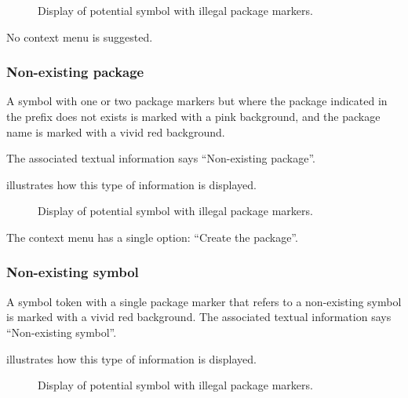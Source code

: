 \begin{figure}
\begin{center}
\end{center}
\caption{\label{fig-invalid-package-markers}
Display of potential symbol with illegal package markers.}
\end{figure}

No context menu is suggested. 

\subsubsection{Non-existing package}

A symbol with one or two package markers but where the package
indicated in the prefix does not exists is marked with a pink
background, and the package name is marked with a vivid red
background. 

The associated textual information says ``Non-existing package''.

 illustrates how this type of
information is displayed.

\begin{figure}
\begin{center}
\end{center}
\caption{\label{fig-non-existing-package}
Display of potential symbol with illegal package markers.}
\end{figure}

The context menu has a single option: ``Create the package''.

\subsubsection{Non-existing symbol}

A symbol token with a single package marker that refers to a
non-existing symbol is marked with a vivid red background.  The
associated textual information says ``Non-existing symbol''.  

 illustrates how this type of
information is displayed.

\begin{figure}
\begin{center}
\end{center}
\caption{\label{fig-non-existing-symbol}
Display of potential symbol with illegal package markers.}
\end{figure}

